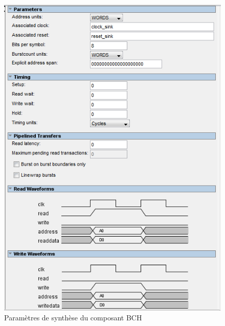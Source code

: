 \documentclass[a4paper, 11pt, svgnames]{report}
\begin{document}
        \begin{figure}[H]
            \centering
            \includegraphics[width=\textwidth]{./images/BCH_0_parameters}
            \caption{Paramètres de synthèse du composant BCH}
            \label{fig:BCH_0_parameters}
        \end{figure}
\end{document}
